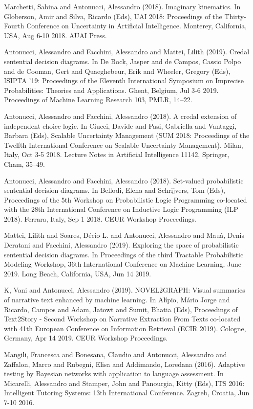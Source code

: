 \begin{cventries}
\begin{cvitems}
\item Marchetti, Sabina and Antonucci, Alessandro (2018).   Imaginary kinematics.   In Globerson, Amir and Silva, Ricardo (Eds), UAI 2018: Proceedings of the Thirty-Fourth Conference on Uncertainty in Artificial Intelligence.   Monterey, California, USA,   Aug 6-10 2018.   AUAI Press.
\item Antonucci, Alessandro and Facchini, Alessandro and Mattei, Lilith (2019).   Credal sentential decision diagrams.   In De Bock, Jasper and de Campos, Cassio Polpo and de Cooman, Gert and Quaeghebeur, Erik and Wheeler, Gregory (Eds), ISIPTA ’19: Proceedings of the Eleventh International Symposium on Imprecise Probabilities: Theories and Applications.   Ghent, Belgium, Jul 3-6 2019.   Proceedings of Machine Learning Research 103, PMLR, 14–22.
\item Antonucci, Alessandro and Facchini, Alessandro (2018).   A credal extension of independent choice logic.   In Ciucci, Davide and Pasi, Gabriella and Vantaggi, Barbara (Eds), Scalable Uncertainty Management (SUM 2018: Proceedings of the Twelfth International Conference on Scalable Uncertainty Management).   Milan, Italy, Oct 3-5 2018.   Lecture Notes in Artificial Intelligence 11142, Springer, Cham, 35–49.
\item Antonucci, Alessandro and Facchini, Alessandro (2018).   Set-valued probabilistic sentential decision diagrams.   In Bellodi, Elena and Schrijvers, Tom (Eds), Proceedings of the 5th Workshop on Probabilistic Logic Programming co-located with the 28th International Conference on Inductive Logic Programming (ILP 2018).   Ferrara, Italy,   Sep 1 2018.   CEUR Workshop Proceedings.
\item Mattei, Lilith and Soares, Décio L. and Antonucci, Alessandro and Mauà, Denis Deratani and Facchini, Alessandro (2019).   Exploring the space of probabilistic sentential decision diagrams.   In Proceedings of the third Tractable Probabilistic Modeling Workshop, 36th International Conference on Machine Learning, June 2019.   Long Beach, California, USA,   Jun 14 2019.
\item K, Vani and Antonucci, Alessandro (2019).   NOVEL2GRAPH: Visual summaries of narrative text enhanced by machine learning.   In Alípio, Mário Jorge and Ricardo, Campos and Adam, Jatowt and Sumit, Bhatia (Eds), Proceedings of Text2Story - Second Workshop on Narrative Extraction From Texts co-located with 41th European Conference on Information Retrieval (ECIR 2019).   Cologne, Germany,   Apr 14 2019.   CEUR Workshop Proceedings.
\item Mangili, Francesca and Bonesana, Claudio and Antonucci, Alessandro and Zaffalon, Marco and Rubegni, Elisa and Addimando, Loredana (2016).   Adaptive testing by Bayesian networks with application to language assessment.   In Micarelli, Alessandro and Stamper, John and Panourgia, Kitty (Eds), ITS 2016: Intelligent Tutoring Systems: 13th International Conference.   Zagreb, Croatia,   Jun 7-10 2016.

\end{cvitems}
\end{cventries}
